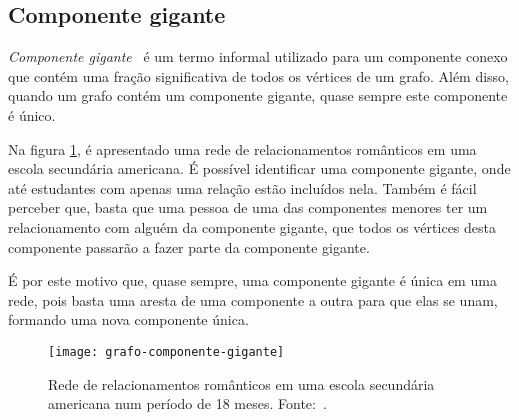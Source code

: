 \subsection{Componente gigante}
\label{conceitos__grafo--componente-gigante}

\emph{Componente gigante}~\cite{easley2010networks} é um termo informal utilizado para 
um componente conexo que contém uma fração significativa de todos os vértices de um grafo. Além disso, quando um grafo contém um componente gigante, quase sempre este componente é único.

Na figura \ref{fig:grafo-componente-gigante}, é apresentado uma rede de relacionamentos românticos em uma escola secundária americana. É possível identificar uma componente gigante, onde até estudantes com apenas uma relação estão incluídos nela. Também é fácil perceber que, basta que uma pessoa de uma das componentes menores ter um relacionamento com alguém da componente gigante, que todos os vértices desta componente passarão a fazer parte da componente gigante. 

É por este motivo que, quase sempre, uma componente gigante é única em uma rede, pois basta uma aresta de uma componente a outra para que elas se unam, formando uma nova componente única.

\begin{figure}[H]
\texttt{[image: grafo-componente-gigante]}
\centering
\caption{
    Rede de relacionamentos românticos em uma escola secundária americana num período de 18 meses. Fonte:~\cite{bearman2004chains}.
}
\label{fig:grafo-componente-gigante}
\end{figure}





